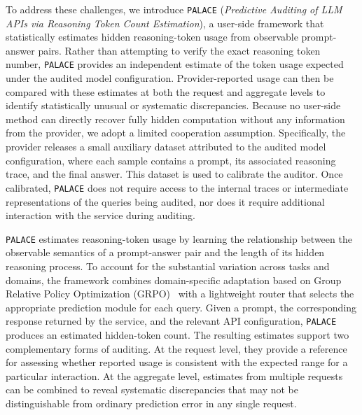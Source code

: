 \documentclass[pdflatex,sn-mathphys-num]{sn-jnl}%
\newcommand{\n}{\texttt{PALACE}\xspace}
\theoremstyle{thmstyleone}%
\theoremstyle{thmstyletwo}%
\theoremstyle{thmstylethree}%
\begin{document}

To address these challenges, we introduce {\n} (\textit{Predictive Auditing of LLM APIs via Reasoning Token Count Estimation}), a user-side framework that statistically estimates hidden
reasoning-token usage from observable prompt-answer pairs. Rather than
attempting to verify the exact reasoning token number,
{\n} provides an independent estimate of the token usage expected under the
audited model configuration. Provider-reported usage can then be compared with
these estimates at both the request and aggregate levels to identify
statistically unusual or systematic discrepancies.
Because no user-side method can directly recover fully hidden computation
without any information from the provider, we adopt a limited cooperation
assumption. Specifically, the provider releases a small auxiliary dataset
attributed to the audited model configuration, where each sample contains a
prompt, its associated reasoning trace, and the final answer. This dataset is
used to calibrate the auditor. Once calibrated, {\n} does not require access to
the internal traces or intermediate representations of the queries being
audited, nor does it require additional interaction with the service during
auditing.

{\n} estimates reasoning-token usage by learning the relationship between the
observable semantics of a prompt-answer pair and the length of its hidden
reasoning process. To account for the substantial variation across tasks and
domains, the framework combines domain-specific adaptation based on Group
Relative Policy Optimization (GRPO)~\citep{shao2024deepseekmath} with a
lightweight router that selects the appropriate prediction module for each
query. Given a prompt, the corresponding response returned by the service, and
the relevant API configuration, {\n} produces an estimated hidden-token count.
The resulting estimates support two complementary forms of auditing. At the
request level, they provide a reference for assessing whether reported usage is
consistent with the expected range for a particular interaction. At the
aggregate level, estimates from multiple requests can be combined to reveal
systematic discrepancies that may not be distinguishable from ordinary
prediction error in any single request.
\end{document}
